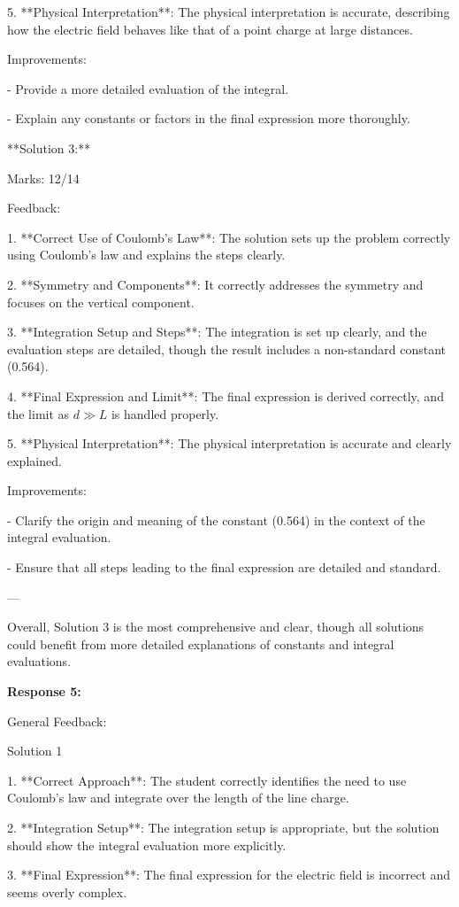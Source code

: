 \documentclass[a4paper,11pt]{article}
\begin{document}
5. **Physical Interpretation**: The physical interpretation is accurate, describing how the electric field behaves like that of a point charge at large distances.

Improvements:

- Provide a more detailed evaluation of the integral.

- Explain any constants or factors in the final expression more thoroughly.

**Solution 3:**

Marks: 12/14

Feedback:

1. **Correct Use of Coulomb's Law**: The solution sets up the problem correctly using Coulomb's law and explains the steps clearly.

2. **Symmetry and Components**: It correctly addresses the symmetry and focuses on the vertical component.

3. **Integration Setup and Steps**: The integration is set up clearly, and the evaluation steps are detailed, though the result includes a non-standard constant (0.564).

4. **Final Expression and Limit**: The final expression is derived correctly, and the limit as \( d \gg L \) is handled properly.

5. **Physical Interpretation**: The physical interpretation is accurate and clearly explained.

Improvements:

- Clarify the origin and meaning of the constant (0.564) in the context of the integral evaluation.

- Ensure that all steps leading to the final expression are detailed and standard.

---

Overall, Solution 3 is the most comprehensive and clear, though all solutions could benefit from more detailed explanations of constants and integral evaluations.

\bigskip
\textbf{Response 5:}

General Feedback:

Solution 1

1. **Correct Approach**: The student correctly identifies the need to use Coulomb’s law and integrate over the length of the line charge.

2. **Integration Setup**: The integration setup is appropriate, but the solution should show the integral evaluation more explicitly.

3. **Final Expression**: The final expression for the electric field is incorrect and seems overly complex.
\end{document}
